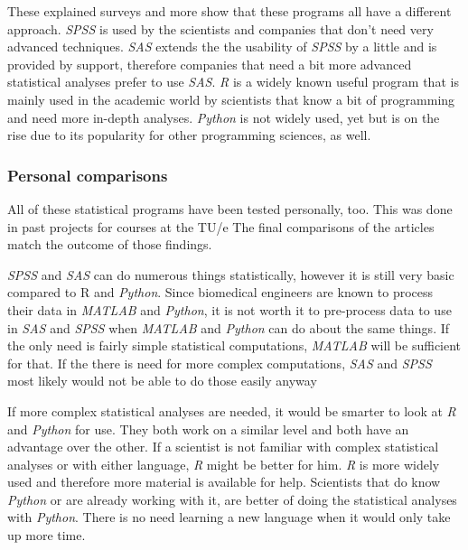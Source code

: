 \documentclass[10pt,a4paper]{report}
\begin{document}
	These explained surveys and more  \cite{BlogWillems2014} 
	 \cite{BlogSupport2017} show that these programs all have a different 
	approach. \textit{SPSS} is used by the scientists and companies that don't need very 
	advanced techniques. \textit{SAS} extends the the usability of \textit{SPSS} by a little and 
	is provided by support, therefore companies that need a bit more advanced 
	statistical analyses prefer to use \textit{SAS}. \textit{R} is a widely known useful program 
	that is mainly used in the academic world by scientists that know a bit of 
	programming and need more in-depth analyses. \textit{Python} is not widely used, yet 
	but is on the rise due to its popularity for other programming sciences, as 
	well.
	
	\subsubsection{Personal comparisons}
	
	All of these statistical programs have been tested personally, too. This 
	was done in past projects for courses at the TU/e The 
	final comparisons of the articles match the outcome of those findings. 
	
	\textit{SPSS} and \textit{SAS} can do numerous things statistically, however it is still very 
	basic compared to R and \textit{Python}. Since biomedical engineers are known to 
	process their data in \textit{MATLAB} and \textit{Python}, it is not worth it to pre-process 
	data to use in \textit{SAS} and \textit{SPSS} when \textit{MATLAB} and \textit{Python} can do about the same 
	things. If the only need is fairly simple statistical computations, \textit{MATLAB} 
	will be sufficient for that. If the there is need for more complex 
	computations, \textit{SAS} and \textit{SPSS} most likely would not be able to do those easily 
	anyway 
	
	If more complex statistical analyses are needed, it would be smarter to 
	look at \textit{R} and \textit{Python} for use. They both work on a similar level and both 
	have an advantage over the other. If a scientist is not familiar with 
	complex statistical analyses or with either language, \textit{R} might be better for 
	him. \textit{R} is more widely used and therefore more material is available for 
	help. Scientists that do know \textit{Python} or are already working with it, are 
	better of doing the statistical analyses with \textit{Python}. There is no need 
	learning a new language when it would only take up more time.
	
\end{document}
